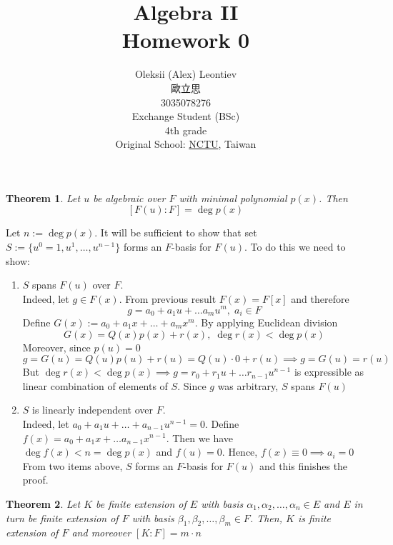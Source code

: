 \documentclass[8pt]{article} %
\title{Algebra II\\Homework 0}
\author{Oleksii (Alex) Leontiev\\歐立思\\3035078276\\Exchange Student (BSc)\\4th grade\\
Original School: \href{http://www.nctu.edu.tw/}{NCTU}, Taiwan}
\newtheorem{theorem}{Theorem}
\newenvironment{proof}[1][Proof]{\begin{trivlist}
\item[\hskip \labelsep {\bfseries #1}]}{\qed\end{trivlist}}
\newcommand{\qed}{\nobreak \ifvmode \relax \else
\ifdim\lastskip<1.5em \hskip-\lastskip
\hskip1.5em plus0em minus0.5em \fi \nobreak
  \vrule height0.75em width0.5em depth0.25em\fi}
\begin{document}
\begin{CJK}{UTF8}{bsmi}
\maketitle
\end{CJK}

\begin{theorem} Let $u$ be algebraic over $F$ with minimal polynomial $p(x)$. Then
\[[F(u):F]=\deg p(x)\]
\end{theorem}

\begin{proof}
Let $n:=\deg p(x)$. It will be
 sufficient to show that set $S:=\{u^0=1,u^1,\dots,u^{n-1}\}$ forms an $F$-basis for $F(u)$. To do this we need to show:
\begin{enumerate}
\item{$S$ spans $F(u)$ over $F$.\\ Indeed, let $g\in F(x)$. From previous result $F(x)=F[x]$ and therefore
\[g=a_0+a_1u+\dots a_m u^m,\;a_i\in F\]
Define $G(x):=a_0+a_1x+\dots+a_mx^m$. By applying Euclidean division
\[G(x)=Q(x)p(x)+r(x),\;\deg r(x)<\deg p(x)\]
Moreover, since $p(u)=0$
\[g=G(u)=Q(u)p(u)+r(u)=Q(u)\cdot 0+r(u)\implies g=G(u)=r(u)\]
But $\deg r(x)<\deg p(x)\implies g=r_0+r_1 u+\dots r_{n-1}u^{n-1}$ is expressible as linear combination of elements of $S$. 
Since $g$ was arbitrary, $S$ spans $F(u)$}
\item{$S$ is linearly independent over $F$.\\
Indeed, let $a_0+a_1u+\dots+a_{n-1}u^{n-1}=0$. Define $f(x)=a_0+a_1x+\dots a_{n-1}x^{n-1}$. Then we have $\deg f(x)<n=\deg p(x)$ and $f(u)=0$.
Hence, $f(x)\equiv 0\implies a_i=0$
From two items above, $S$ forms an $F$-basis for $F(u)$ and this finishes the proof.
}
\end{enumerate}
\end{proof}

\begin{theorem} Let $K$ be finite extension of $E$ with basis $\alpha_1,\alpha_2,\dots,\alpha_n\in E$ and $E$ in turn be finite
extension of $F$ with basis $\beta_1,\beta_2,\dots,\beta_m\in F$. Then, $K$ is finite extension of $F$ and moreover $[K:F]=m\cdot n$
\end{theorem}
\end{document}
